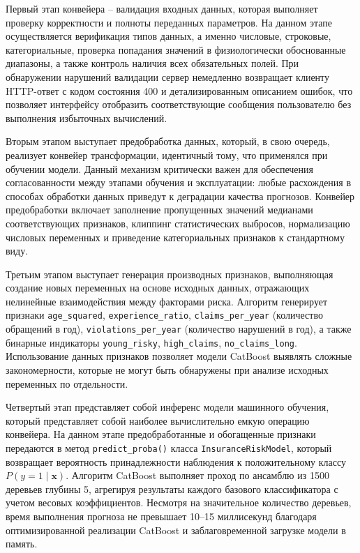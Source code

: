Первый этап конвейера – валидация входных данных, которая выполняет проверку корректности и полноты переданных параметров. На данном этапе осуществляется верификация типов данных, а именно числовые, строковые, категориальные, проверка попадания значений в физиологически обоснованные диапазоны, а также контроль наличия всех обязательных полей. При обнаружении нарушений валидации сервер немедленно возвращает клиенту HTTP-ответ с кодом состояния 400 и детализированным описанием ошибок, что позволяет интерфейсу отобразить соответствующие сообщения пользователю без выполнения избыточных вычислений.

Вторым этапом выступает предобработка данных, который, в свою очередь, реализует конвейер трансформации, идентичный тому, что применялся при обучении модели. Данный механизм критически важен для обеспечения согласованности между этапами обучения и эксплуатации: любые расхождения в способах обработки данных приведут к деградации качества прогнозов. Конвейер предобработки включает заполнение пропущенных значений медианами соответствующих признаков, клиппинг статистических выбросов, нормализацию числовых переменных и приведение категориальных признаков к стандартному виду.

Третьим этапом выступает генерация производных признаков, выполняющая создание новых переменных на основе исходных данных, отражающих нелинейные взаимодействия между факторами риска. Алгоритм генерирует признаки \texttt{age\_squared}, \texttt{experience\_ratio}, \texttt{claims\_per\_year} (количество обращений в год), \texttt{violations\_per\_year} (количество нарушений в год), а также бинарные индикаторы \texttt{young\_risky}, \texttt{high\_claims}, \texttt{no\_claims\_long}. Использование данных признаков позволяет модели CatBoost выявлять сложные закономерности, которые не могут быть обнаружены при анализе исходных переменных по отдельности.

Четвертый этап представляет собой инференс модели машинного обучения, который представляет собой наиболее вычислительно емкую операцию конвейера. На данном этапе предобработанные и обогащенные признаки передаются в метод \texttt{predict\_proba()} класса \texttt{InsuranceRiskModel}, который возвращает вероятность принадлежности наблюдения к положительному классу $P(y=1 \mid \mathbf{x})$. Алгоритм CatBoost выполняет проход по ансамблю из 1500 деревьев глубины 5, агрегируя результаты каждого базового классификатора с учетом весовых коэффициентов. Несмотря на значительное количество деревьев, время выполнения прогноза не превышает 10–15 миллисекунд благодаря оптимизированной реализации CatBoost и заблаговременной загрузке модели в память.

